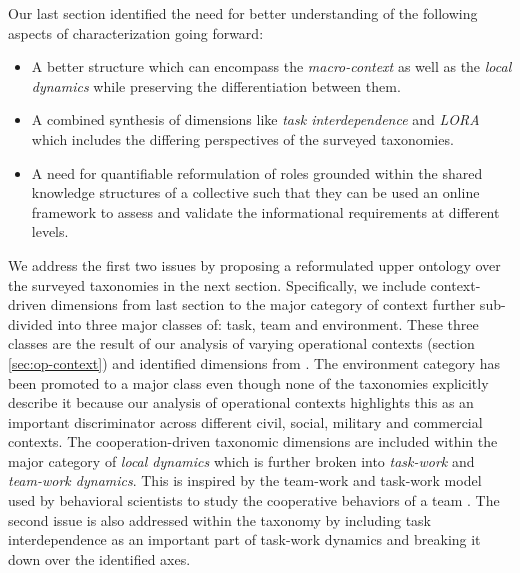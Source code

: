 \documentclass[letterpaper, 10 pt, conference]{ieeeconf}  %
\theoremstyle{definition}
\begin{document}
Our last section identified the need for better understanding of the following aspects of characterization going forward:
\begin{itemize}
    \item A better structure which can encompass the \textit{macro-context} as well as the \textit{local dynamics} while preserving the differentiation between them.
    \item A combined synthesis of dimensions like \textit{task interdependence} and \textit{LORA} which includes the differing perspectives of the surveyed taxonomies.
    \item A need for quantifiable reformulation of roles grounded within the shared knowledge structures of a collective such that they can be used an online framework to assess and validate the informational requirements at different levels.
\end{itemize}

We address the first two issues by proposing a reformulated upper ontology over the surveyed taxonomies in the next section.
Specifically, we include context-driven dimensions from last section to the major category of context further sub-divided into three major classes of: task, team and environment.
These three classes are the result of our analysis of varying operational contexts (section \ref{sec:op-context}) and identified dimensions from \cite{Yanco2004updated, Beer2017, Beer2014toward, Dudek2002updated, cao1997cooperative}.
The environment category has been promoted to a major class even though none of the taxonomies explicitly describe it because our analysis of operational contexts highlights this as an important discriminator across different civil, social, military and commercial contexts.
The cooperation-driven taxonomic dimensions are included within the major category of \textit{local dynamics} which is further broken into \textit{task-work} and \textit{team-work dynamics}.
This is inspired by the team-work and task-work model used by behavioral scientists to study the cooperative behaviors of a team \cite{Mathieu2000TheIO}.
The second issue is also addressed within the taxonomy by including task interdependence as an important part of task-work dynamics and breaking it down over the identified axes.
\end{document}
